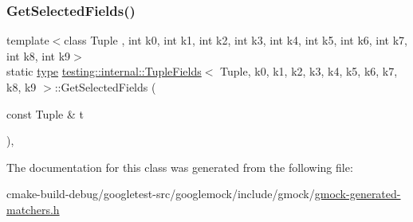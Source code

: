 \subsubsection{\texorpdfstring{GetSelectedFields()}{GetSelectedFields()}}
{\footnotesize\ttfamily template$<$class Tuple , int k0, int k1, int k2, int k3, int k4, int k5, int k6, int k7, int k8, int k9$>$ \\
static \mbox{\hyperlink{classtesting_1_1internal_1_1TupleFields_a5480877377ebc94bf3a6c6cab5c369bc}{type}} \mbox{\hyperlink{classtesting_1_1internal_1_1TupleFields}{testing\+::internal\+::\+Tuple\+Fields}}$<$ Tuple, k0, k1, k2, k3, k4, k5, k6, k7, k8, k9 $>$\+::Get\+Selected\+Fields (\begin{DoxyParamCaption}\item[{const Tuple \&}]{t }\end{DoxyParamCaption})\hspace{0.3cm}{\ttfamily [inline]}, {\ttfamily [static]}}



The documentation for this class was generated from the following file\+:\begin{DoxyCompactItemize}
\item 
cmake-\/build-\/debug/googletest-\/src/googlemock/include/gmock/\mbox{\hyperlink{gmock-generated-matchers_8h}{gmock-\/generated-\/matchers.\+h}}\end{DoxyCompactItemize}
